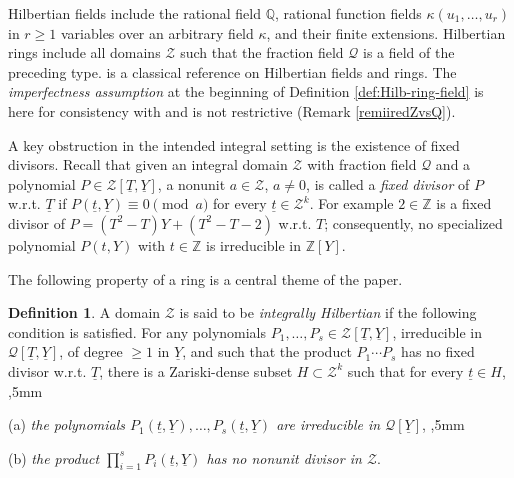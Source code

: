 \documentclass[11pt,a4paper,reqno]{amsart}
\def\Z{\mathbb{Z}}
\theoremstyle{definition}
\newtheorem{defn}[thm]{Definition}
\begin{document}
Hilbertian fields include the rational field ${\mathbb Q}$, rational function fields $\kappa(u_1,\ldots,u_r)$ in $r\geq 1$ variables over an arbitrary field $\kappa$, and their finite extensions. 
Hilbertian rings include all domains ${\mathcal Z}$ such that the fraction field ${\mathcal Q}$ is a field of the preceding type. \cite{FJ23} is a classical reference on Hilbertian fields and rings. The \emph{imperfectness assumption} at the beginning of Definition \ref{def:Hilb-ring-field} is here for consistency with \cite{FJ23} and is not restrictive (Remark \ref{remiiredZvsQ}). 
\vskip 1mm




A key obstruction in the intended integral setting is the existence of fixed divisors. Recall that given an integral domain ${\mathcal Z}$ with fraction field ${\mathcal Q}$ and a polynomial $P \in {\mathcal Z}[\underline{T},\underline{Y}]$, a nonunit $a \in {\mathcal Z}$, $a\not=0$, is called a \emph{fixed divisor} of $P$ \hbox{w.r.t.} $\underline{T}$ if
$P(\underline{t},\underline{Y}) \equiv 0 \pmod{a}$ for every $\underline{t} \in {\mathcal Z}^k$. For example $2\in \Z$ is a fixed divisor of $P=(T^2-T)Y+(T^2-T-2)$
\hbox{w.r.t.} ${T}$; consequently, no specialized polynomial $P(t,Y)$ with $t\in {\mathbb Z}$
is irreducible in $\Z[Y]$. 
\vskip 1mm

The following property of a ring is a central theme of the paper. 

\begin{defn} \label{def:int-Hilb}
A domain ${\mathcal Z}$ is said to be \emph{integrally Hilbertian} if the following condition is satisfied. For any polynomials $P_1,\ldots,P_s \in \mathcal{Z}[\underline{T},\underline{Y}]$, irreducible  in ${\mathcal Q}[\underline{T},\underline{Y}]$, of degree $\geq 1$ in $\underline{Y}$, and such that  the product $P_1 \cdots P_s$ has no fixed divisor \hbox{w.r.t.} $\underline{T}$, there is a Zariski-dense subset ${H} \subset {\mathcal Z}^k$ such that for every $\underline{t} \in {H}$, 
,5mm

\noindent
{\rm (a)} \emph{the polynomials $P_1(\underline{t},\underline{Y}),\dots,P_s(\underline{t},\underline{Y})$ are irreducible in $\mathcal{Q}[\underline{Y}]$}, 
,5mm

\noindent
{\rm (b)} \emph{the product $\prod_{i=1}^s P_i(\underline t,\underline Y)$ has no nonunit divisor in ${\mathcal Z}$}.
\end{defn}
\end{document}

